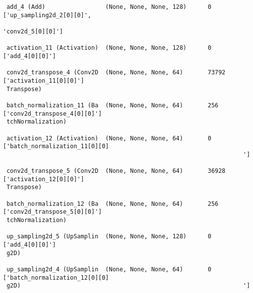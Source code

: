 \documentclass[
  letterpaper,
  DIV=11,
  numbers=noendperiod]{scrreprt}
\begin{document}
\begin{verbatim}
 add_4 (Add)                 (None, None, None, 128)      0         ['up_sampling2d_2[0][0]',     
                                                                     'conv2d_5[0][0]']            
                                                                                                  
 activation_11 (Activation)  (None, None, None, 128)      0         ['add_4[0][0]']               
                                                                                                  
 conv2d_transpose_4 (Conv2D  (None, None, None, 64)       73792     ['activation_11[0][0]']       
 Transpose)                                                                                       
                                                                                                  
 batch_normalization_11 (Ba  (None, None, None, 64)       256       ['conv2d_transpose_4[0][0]']  
 tchNormalization)                                                                                
                                                                                                  
 activation_12 (Activation)  (None, None, None, 64)       0         ['batch_normalization_11[0][0]
                                                                    ']                            
                                                                                                  
 conv2d_transpose_5 (Conv2D  (None, None, None, 64)       36928     ['activation_12[0][0]']       
 Transpose)                                                                                       
                                                                                                  
 batch_normalization_12 (Ba  (None, None, None, 64)       256       ['conv2d_transpose_5[0][0]']  
 tchNormalization)                                                                                
                                                                                                  
 up_sampling2d_5 (UpSamplin  (None, None, None, 128)      0         ['add_4[0][0]']               
 g2D)                                                                                             
                                                                                                  
 up_sampling2d_4 (UpSamplin  (None, None, None, 64)       0         ['batch_normalization_12[0][0]
 g2D)                                                               ']                            
                                                                                                  

\end{verbatim}
\end{document}
